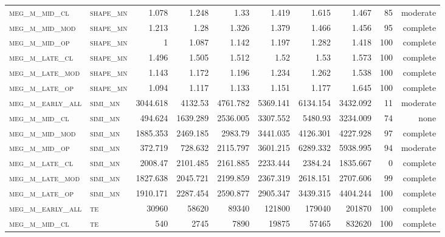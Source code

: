 \begin{landscape}
\begin{center}
\begin{footnotesize}
\begin{longtable}{llrrrrr|rrr}
\textsc{meg\_m\_mid\_cl   } & \textsc{shape\_mn }   & 1.078    & 1.248    & 1.33     & 1.419    & 1.615    & 1.467    & 85  & moderate \\
\textsc{meg\_m\_mid\_mod  } & \textsc{shape\_mn }   & 1.213    & 1.28     & 1.326    & 1.379    & 1.466    & 1.456    & 95  & complete \\
\textsc{meg\_m\_mid\_op   } & \textsc{shape\_mn }   & 1        & 1.087    & 1.142    & 1.197    & 1.282    & 1.418    & 100 & complete \\
\textsc{meg\_m\_late\_cl  } & \textsc{shape\_mn }   & 1.496    & 1.505    & 1.512    & 1.52     & 1.53     & 1.573    & 100 & complete \\
\textsc{meg\_m\_late\_mod } & \textsc{shape\_mn }   & 1.143    & 1.172    & 1.196    & 1.234    & 1.262    & 1.538    & 100 & complete \\
\textsc{meg\_m\_late\_op  } & \textsc{shape\_mn }   & 1.094    & 1.117    & 1.133    & 1.151    & 1.177    & 1.645    & 100 & complete \\
\textsc{meg\_m\_early\_all} & \textsc{simi\_mn  }   & 3044.618 & 4132.53  & 4761.782 & 5369.141 & 6134.154 & 3432.092 & 11  & moderate \\
\textsc{meg\_m\_mid\_cl   } & \textsc{simi\_mn  }   & 494.624  & 1639.289 & 2536.005 & 3307.552 & 5480.93  & 3234.009 & 74  & none     \\
\textsc{meg\_m\_mid\_mod  } & \textsc{simi\_mn  }   & 1885.353 & 2469.185 & 2983.79  & 3441.035 & 4126.301 & 4227.928 & 97  & complete \\
\textsc{meg\_m\_mid\_op   } & \textsc{simi\_mn  }   & 372.719  & 728.632  & 2115.797 & 3601.215 & 6289.332 & 5938.995 & 94  & moderate \\
\textsc{meg\_m\_late\_cl  } & \textsc{simi\_mn  }   & 2008.47  & 2101.485 & 2161.885 & 2233.444 & 2384.24  & 1835.667 & 0   & complete \\
\textsc{meg\_m\_late\_mod } & \textsc{simi\_mn  }   & 1827.638 & 2045.721 & 2199.859 & 2367.319 & 2618.151 & 2707.606 & 99  & complete \\
\textsc{meg\_m\_late\_op  } & \textsc{simi\_mn  }   & 1910.171 & 2287.454 & 2590.877 & 2905.347 & 3439.315 & 4404.244 & 100 & complete \\
\textsc{meg\_m\_early\_all} & \textsc{te  		}   & 30960    & 58620    & 89340    & 121800   & 179040   & 201870   & 100 & complete \\
\textsc{meg\_m\_mid\_cl   } & \textsc{te  		}   & 540      & 2745     & 7890     & 19875    & 57465    & 832620   & 100 & complete \\

\end{longtable}
\end{footnotesize}
\end{center}
\end{landscape}
